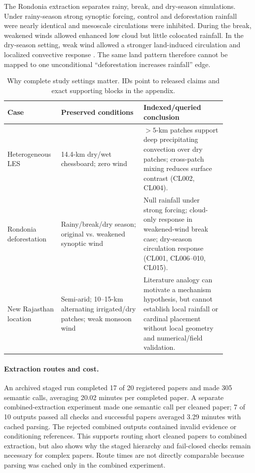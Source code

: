 \documentclass{article}
\begin{document}
The Rondonia extraction separates rainy, break, and dry-season simulations. Under rainy-season strong synoptic forcing, control and deforestation rainfall were nearly identical and mesoscale circulations were inhibited. During the break, weakened winds allowed enhanced low cloud but little colocated rainfall. In the dry-season setting, weak wind allowed a stronger land-induced circulation and localized convective response \citep{wang2000}. The same land pattern therefore cannot be mapped to one unconditional ``deforestation increases rainfall'' edge.

\begin{table}[t]
\centering\scriptsize
\caption{Why complete study settings matter. IDs point to released claims and exact supporting blocks in the appendix.}
\label{tab:cases}
\begin{tabular}{p{0.18\linewidth}p{0.35\linewidth}p{0.35\linewidth}}
\toprule
Case & Preserved conditions & Indexed/queried conclusion \\
\midrule
Heterogeneous LES & 14.4-km dry/wet chessboard; zero wind & $>5$-km patches support deep precipitating convection over dry patches; cross-patch mixing reduces surface contrast (CL002, CL004). \\
Rondonia deforestation & Rainy/break/dry season; original vs. weakened synoptic wind & Null rainfall under strong forcing; cloud-only response in weakened-wind break case; dry-season circulation response (CL001, CL006--010, CL015). \\
New Rajasthan location & Semi-arid; 10--15-km alternating irrigated/dry patches; weak monsoon wind & Literature analogy can motivate a mechanism hypothesis, but cannot establish local rainfall or cardinal placement without local geometry and numerical/field validation. \\
\bottomrule
\end{tabular}
\end{table}

\paragraph{Extraction routes and cost.}
An archived staged run completed 17 of 20 registered papers and made 305 semantic calls, averaging 20.02 minutes per completed paper. A separate combined-extraction experiment made one semantic call per cleaned paper; 7 of 10 outputs passed all checks and successful papers averaged 3.29 minutes with cached parsing. The rejected combined outputs contained invalid evidence or conditioning references. This supports routing short cleaned papers to combined extraction, but also shows why the staged hierarchy and fail-closed checks remain necessary for complex papers. Route times are not directly comparable because parsing was cached only in the combined experiment.
\end{document}
